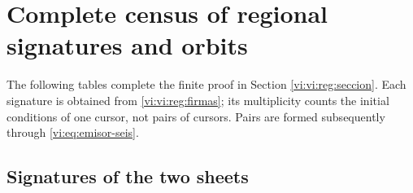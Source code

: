 \section{Complete census of regional signatures and orbits}
\label{vi:vi:reg:tablas}

The following tables complete the finite proof in Section
\ref{vi:vi:reg:seccion}. Each signature is obtained from
\eqref{vi:vi:reg:firmas}; its multiplicity counts the initial
conditions of one cursor, not pairs of cursors. Pairs are
formed subsequently through \eqref{vi:eq:emisor-seis}.

\subsection{Signatures of the two sheets}


